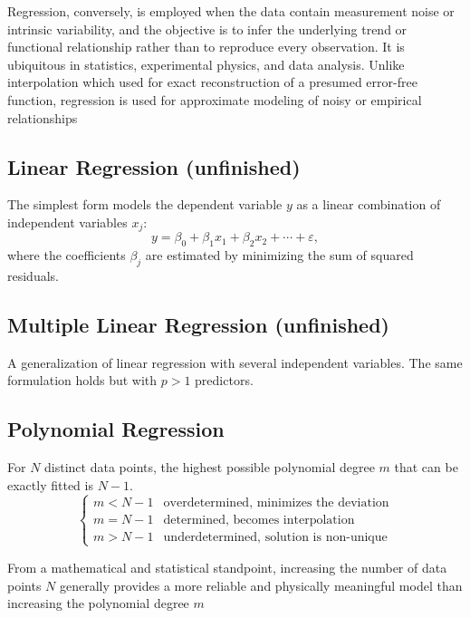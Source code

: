 \documentclass[../../../main.tex]{subfiles}
\begin{document}
Regression, conversely, is employed when the data contain measurement noise or intrinsic variability, and the objective is to infer the underlying trend or functional relationship rather than to reproduce every observation.
It is ubiquitous in statistics, experimental physics, and data analysis.
Unlike interpolation which used for exact reconstruction of a presumed error-free function, regression is used for approximate modeling of noisy or empirical relationships

\subsection{Linear Regression (unfinished)}
The simplest form models the dependent variable \( y \) as a linear combination of independent variables \( x_j \):
\begin{equation*}
    y = \beta_0 + \beta_1 x_1 + \beta_2 x_2 + \cdots + \varepsilon,
\end{equation*}
where the coefficients \( \beta_j \) are estimated by minimizing the sum of squared residuals.

\subsection{Multiple Linear Regression (unfinished)}
A generalization of linear regression with several independent variables.
The same formulation holds but with \( p > 1 \) predictors.

\subsection{Polynomial Regression}
For $N$ distinct data points, the highest possible polynomial degree $m$ that can be exactly fitted is $N-1$.
\begin{equation*}
    \begin{cases}
        m<N-1 & \text{overdetermined, minimizes the deviation} \\
        m=N-1 & \text{determined, becomes interpolation}       \\
        m>N-1 & \text{underdetermined, solution is non-unique}
    \end{cases}
\end{equation*}

From a mathematical and statistical standpoint, increasing the number of data points $N$ generally provides a more reliable and physically meaningful model than increasing the polynomial degree $m$
\end{document}
